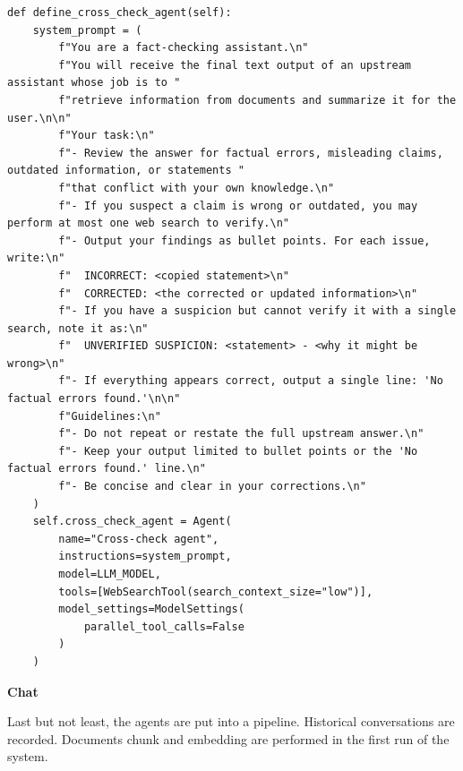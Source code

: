 \begin{lstlisting}
def define_cross_check_agent(self):
    system_prompt = (
        f"You are a fact-checking assistant.\n"
        f"You will receive the final text output of an upstream assistant whose job is to "
        f"retrieve information from documents and summarize it for the user.\n\n"
        f"Your task:\n"
        f"- Review the answer for factual errors, misleading claims, outdated information, or statements "
        f"that conflict with your own knowledge.\n"
        f"- If you suspect a claim is wrong or outdated, you may perform at most one web search to verify.\n"
        f"- Output your findings as bullet points. For each issue, write:\n"
        f"  INCORRECT: <copied statement>\n"
        f"  CORRECTED: <the corrected or updated information>\n"
        f"- If you have a suspicion but cannot verify it with a single search, note it as:\n"
        f"  UNVERIFIED SUSPICION: <statement> - <why it might be wrong>\n"
        f"- If everything appears correct, output a single line: 'No factual errors found.'\n\n"
        f"Guidelines:\n"
        f"- Do not repeat or restate the full upstream answer.\n"
        f"- Keep your output limited to bullet points or the 'No factual errors found.' line.\n"
        f"- Be concise and clear in your corrections.\n"
    )
    self.cross_check_agent = Agent(
        name="Cross-check agent",
        instructions=system_prompt,
        model=LLM_MODEL,
        tools=[WebSearchTool(search_context_size="low")],
        model_settings=ModelSettings(
            parallel_tool_calls=False
        )
    )
\end{lstlisting} 

\vspace{0.1in}
\noindent \textbf{Chat}
\vspace{0.1in}

Last but not least, the agents are put into a pipeline. Historical conversations are recorded. Documents chunk and embedding are performed in the first run of the system.

